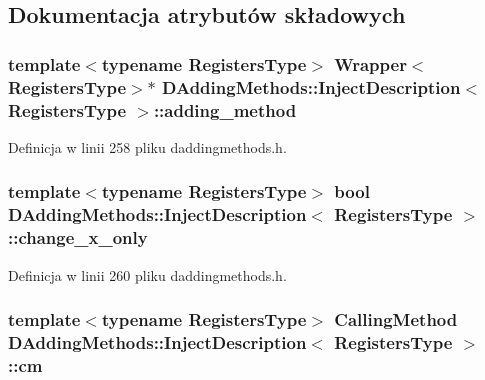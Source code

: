 \subsection{Dokumentacja atrybutów składowych}
\hypertarget{class_d_adding_methods_1_1_inject_description_acea7bb1b146f912703e30039f200b538}{
\subsubsection[{adding\-\_\-method}]{\setlength{\rightskip}{0pt plus 5cm}template$<$typename Registers\-Type$>$ {\bf Wrapper}$<$Registers\-Type$>$$\ast$ {\bf D\-Adding\-Methods\-::\-Inject\-Description}$<$ Registers\-Type $>$\-::adding\-\_\-method}}\label{class_d_adding_methods_1_1_inject_description_acea7bb1b146f912703e30039f200b538}


Definicja w linii 258 pliku daddingmethods.\-h.

\hypertarget{class_d_adding_methods_1_1_inject_description_a8046652b0fae10f8e04e0678fd5961fd}{
\subsubsection[{change\-\_\-x\-\_\-only}]{\setlength{\rightskip}{0pt plus 5cm}template$<$typename Registers\-Type$>$ bool {\bf D\-Adding\-Methods\-::\-Inject\-Description}$<$ Registers\-Type $>$\-::change\-\_\-x\-\_\-only}}\label{class_d_adding_methods_1_1_inject_description_a8046652b0fae10f8e04e0678fd5961fd}


Definicja w linii 260 pliku daddingmethods.\-h.

\hypertarget{class_d_adding_methods_1_1_inject_description_a71f8164f1c9e433b6b22b5480dc5f066}{
\subsubsection[{cm}]{\setlength{\rightskip}{0pt plus 5cm}template$<$typename Registers\-Type$>$ {\bf Calling\-Method} {\bf D\-Adding\-Methods\-::\-Inject\-Description}$<$ Registers\-Type $>$\-::cm}}\label{class_d_adding_methods_1_1_inject_description_a71f8164f1c9e433b6b22b5480dc5f066}



